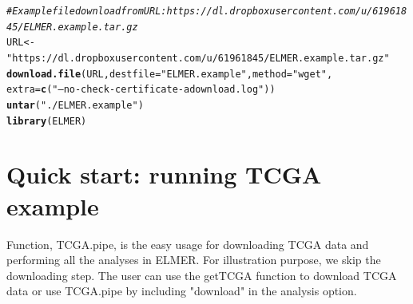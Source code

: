 \documentclass{article}\usepackage[]{graphicx}\usepackage[usenames,dvipsnames]{color}
\makeatletter
\newcommand{\hlstr}[1]{\textcolor[rgb]{0.192,0.494,0.8}{#1}}%
\newcommand{\hlcom}[1]{\textcolor[rgb]{0.678,0.584,0.686}{\textit{#1}}}%
\newcommand{\hlstd}[1]{\textcolor[rgb]{0.345,0.345,0.345}{#1}}%
\newcommand{\hlkwb}[1]{\textcolor[rgb]{0.69,0.353,0.396}{#1}}%
\newcommand{\hlkwc}[1]{\textcolor[rgb]{0.333,0.667,0.333}{#1}}%
\newcommand{\hlkwd}[1]{\textcolor[rgb]{0.737,0.353,0.396}{\textbf{#1}}}%
\newenvironment{kframe}{%
 \def\at@end@of@kframe{}%
 \ifinner\ifhmode%
  \def\at@end@of@kframe{\end{minipage}}%
  \begin{minipage}{\columnwidth}%
 \fi\fi%
 \def\FrameCommand##1{\hskip\@totalleftmargin \hskip-\fboxsep
 \colorbox{shadecolor}{##1}\hskip-\fboxsep
     \hskip-\linewidth \hskip-\@totalleftmargin \hskip\columnwidth}%
 \MakeFramed {\advance\hsize-\width
   \@totalleftmargin\z@ \linewidth\hsize
   \@setminipage}}%
 {\par\unskip\endMakeFramed%
 \at@end@of@kframe}
\newenvironment{knitrout}{}{} %
\makeatother
\begin{document}
\begin{knitrout}
\color{fgcolor}\begin{kframe}
\begin{alltt}
\hlcom{#Example file download from URL: https://dl.dropboxusercontent.com/u/61961845/ELMER.example.tar.gz}
\hlstd{URL} \hlkwb{<-} \hlstr{"https://dl.dropboxusercontent.com/u/61961845/ELMER.example.tar.gz"}
\hlkwd{download.file}\hlstd{(URL,}\hlkwc{destfile} \hlstd{=} \hlstr{"ELMER.example"}\hlstd{,}\hlkwc{method}\hlstd{=} \hlstr{"wget"}\hlstd{,}
              \hlkwc{extra} \hlstd{=} \hlkwd{c}\hlstd{(}\hlstr{"--no-check-certificate -a download.log"}\hlstd{))}
\hlkwd{untar}\hlstd{(}\hlstr{"./ELMER.example"}\hlstd{)}
\hlkwd{library}\hlstd{(ELMER)}
\end{alltt}
\end{kframe}
\end{knitrout}


\section{Quick start: running TCGA example}
Function, TCGA.pipe, is the easy usage for downloading TCGA data and performing all 
the analyses in ELMER. For illustration purpose, we skip the downloading step. 
The user can use the getTCGA function to download TCGA data or
use TCGA.pipe by including "download" in the analysis option.
\end{document}
